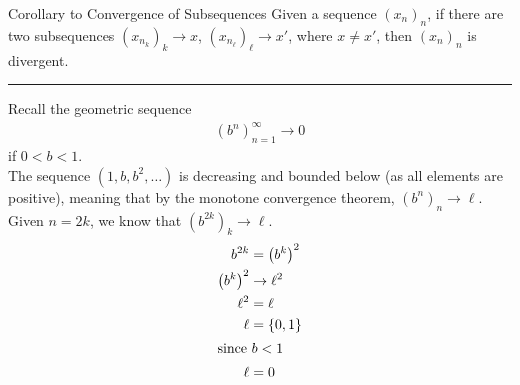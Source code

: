 \documentclass[8pt]{extarticle}
\begin{document}
  \begin{problem}{Corollary to Convergence of Subsequences}
    Given a sequence $(x_n)_n$, if there are two subsequences $(x_{n_k})_k \rightarrow x$, $(x_{n_\ell})_{\ell} \rightarrow x'$, where $x \neq x'$, then $(x_n)_n$ is divergent.\\
    \vspace{4pt}
    \rule{\textwidth}{0.4pt}
    \vspace{4pt}
    Recall the geometric sequence
    \begin{align*}
      (b^n)_{n=1}^{\infty} \rightarrow 0
    \end{align*}
    if $0 < b < 1$.\\

    The sequence $(1,b,b^2,\dots)$ is decreasing and bounded below (as all elements are positive), meaning that by the monotone convergence theorem, $(b^n)_{n} \rightarrow \ell$.\\

    Given $n = 2k$, we know that $(b^{2k})_k \rightarrow \ell$.
    \begin{align*}
      b^{2k} &= \left(b^k\right)^2\\
      \left(b^k\right)^2 &\rightarrow \ell^2\\
      \ell^2 &= \ell\\
      \ell &= \{0,1\}\\
      \shortintertext{since $b < 1$}
      \ell &= 0
    \end{align*}
  \end{problem}
\end{document}
